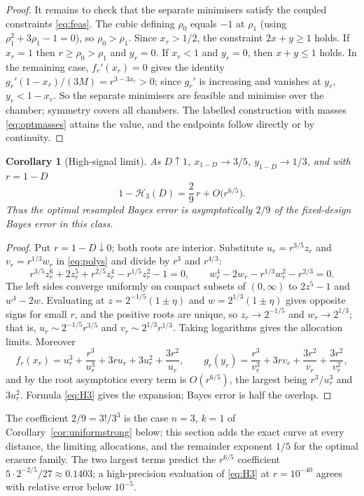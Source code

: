 \documentclass[11pt,a4paper]{article}
\newtheorem{corollary}[theorem]{Corollary}
\theoremstyle{definition}\newtheorem{definition}[theorem]{Definition}
\theoremstyle{remark}\newtheorem{remark}[theorem]{Remark}
\begin{document}
\begin{proof}
It remains to check that the separate minimisers satisfy the coupled constraints \eqref{eq:feas}. The cubic defining $\rho_0$ equals $-1$ at $\rho_1$ (using $\rho_1^2+3\rho_1-1=0$), so $\rho_0>\rho_1$. Since $x_r>1/2$, the constraint $2x+y\ge1$ holds. If $x_r=1$ then $r\ge\rho_0>\rho_1$ and $y_r=0$. If $x_r<1$ and $y_r=0$, then $x+y\le1$ holds. In the remaining case, $f_r'(x_r)=0$ gives the identity
$g_r'(1-x_r)/(3M)=r^{3-3x_r}>0$;
since $g_r'$ is increasing and vanishes at $y_r$, $y_r<1-x_r$. So the separate minimisers are feasible and minimise over the chamber; symmetry covers all chambers. The labelled construction with masses \eqref{eq:optmasses} attains the value, and the endpoints follow directly or by continuity.
\end{proof}

\begin{corollary}[High-signal limit]\label{cor:strong}
As $D\uparrow1$, $x_{1-D}\to3/5$, $y_{1-D}\to1/3$, and with $r=1-D$
\[
1-\mathcal H_3(D)=\frac29\,r+O\bigl(r^{6/5}\bigr).
\]
Thus the optimal resampled Bayes error is asymptotically $2/9$ of the fixed-design Bayes error in this class.
\end{corollary}
\begin{proof}
Put $r=1-D\downarrow0$; both roots are interior. Substitute $u_r=r^{3/5}z_r$ and $v_r=r^{1/3}w_r$ in \eqref{eq:polys} and divide by $r^3$ and $r^{4/3}$:
\[
r^{3/5}z_r^6+2z_r^5+r^{2/5}z_r^4-r^{1/5}z_r^2-1=0,
\qquad
w_r^4-2w_r-r^{1/3}w_r^2-r^{2/3}=0.
\]
The left sides converge uniformly on compact subsets of $(0,\infty)$ to $2z^5-1$ and $w^4-2w$. Evaluating at $z=2^{-1/5}(1\pm\eta)$ and $w=2^{1/3}(1\pm\eta)$ gives opposite signs for small $r$, and the positive roots are unique, so $z_r\to2^{-1/5}$ and $w_r\to2^{1/3}$; that is, $u_r\sim2^{-1/5}r^{3/5}$ and $v_r\sim2^{1/3}r^{1/3}$. Taking logarithms gives the allocation limits. Moreover
\[
f_r(x_r)=u_r^3+\frac{r^3}{u_r^3}+3ru_r+3u_r^2+\frac{3r^2}{u_r},\qquad
g_r(y_r)=\frac{r^3}{v_r^3}+3rv_r+\frac{3r^2}{v_r}+\frac{3r^2}{v_r^2},
\]
and by the root asymptotics every term is $O(r^{6/5})$, the largest being $r^3/u_r^3$ and $3u_r^2$. Formula \eqref{eq:H3} gives the expansion; Bayes error is half the overlap.
\end{proof}
The coefficient $2/9=3!/3^3$ is the case $n=3$, $k=1$ of Corollary~\ref{cor:uniformstrong} below; this section adds the exact curve at every distance, the limiting allocations, and the remainder exponent $1/5$ for the optimal erasure family. The two largest terms predict the $r^{6/5}$ coefficient $5\cdot2^{-2/5}/27\approx0.1403$; a high-precision evaluation of \eqref{eq:H3} at $r=10^{-40}$ agrees with relative error below $10^{-5}$.
\end{document}
